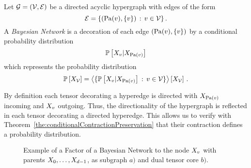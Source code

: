 \begin{definition}
	Let $\mathcal{G}=(\mathcal{V},\mathcal{E})$ be a directed acyclic hypergraph with edges of the form 
		\[ \mathcal{E} = \{(\mathrm{Pa}(v),\{v\}) \, : \, v\in\mathcal{V}\} \, . \]
	A \emph{Bayesian Network} is a decoration of each edge $(\mathrm{Pa}(v),\{v\})$ by a conditional probability distribution
		\[ \mathbb{P}\left[X_{v}|X_{\mathrm{Pa}(v)}\right] \]
	which represents the probability distribution
	\begin{align*}
		\mathbb{P}\left[X_{\mathcal{V}}\right] = \left\langle \{\mathbb{P}\left[X_{v}|X_{\mathrm{Pa}(v)}\right] \, : \, v\in\mathcal{V}\}\right\rangle \left[ X_{\mathcal{V}} \right] \, .
	\end{align*}
\end{definition}

%
By definition each tensor decorating a hyperedge is directed with $X_{\mathrm{Pa}(v)}$ incoming and $X_{v}$ outgoing.
Thus, the directionality of the hypergraph is reflected in each tensor decorating a directed hyperedge.
This allows us to verify with Theorem~\ref{the:conditionalContractionPreservation} that their contraction defines a probability distribution.



\begin{figure}[h]
\begin{center}
	
\end{center}
\caption{Example of a Factor of a Bayesian Network to the node $X_{v}$ with parents $X_{0},\ldots,X_{d-1}$, as subgraph $a)$ and dual tensor core $b)$.}
\label{fig:BayesianFactor}
\end{figure}


